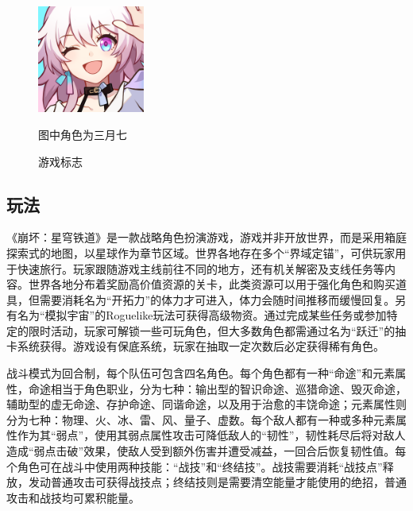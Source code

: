 \begin{figure}
    \centering
    \includegraphics[width=100pt]{docs/imgs/HSR}


    \vspace{6pt}
    \fontSimsun\sizeFivel 图中角色为三月七
    \caption{游戏标志}
    \label{fig:figure1}
\end{figure}

\subsection{玩法}

《崩坏：星穹铁道》是一款战略角色扮演游戏，游戏并非开放世界，而是采用箱庭探索式的地图，以星球作为章节区域。世界各地存在多个“界域定锚”，可供玩家用于快速旅行。玩家跟随游戏主线前往不同的地方，还有机关解密及支线任务等内容。世界各地分布着奖励高价值资源的关卡，此类资源可以用于强化角色和购买道具，但需要消耗名为“开拓力”的体力才可进入，体力会随时间推移而缓慢回复。另有名为“模拟宇宙”的Roguelike玩法可获得高级物资。通过完成某些任务或参加特定的限时活动，玩家可解锁一些可玩角色，但大多数角色都需通过名为“跃迁”的抽卡系统获得。游戏设有保底系统，玩家在抽取一定次数后必定获得稀有角色。

战斗模式为回合制，每个队伍可包含四名角色。每个角色都有一种“命途”和元素属性，命途相当于角色职业，分为七种：输出型的智识命途、巡猎命途、毁灭命途，辅助型的虚无命途、存护命途、同谐命途，以及用于治愈的丰饶命途；元素属性则分为七种：物理、火、冰、雷、风、量子、虚数。每个敌人都有一种或多种元素属性作为其“弱点”，使用其弱点属性攻击可降低敌人的“韧性”，韧性耗尽后将对敌人造成“弱点击破”效果，使敌人受到额外伤害并遭受减益，一回合后恢复韧性值。每个角色可在战斗中使用两种技能：“战技”和“终结技”。战技需要消耗“战技点”释放，发动普通攻击可获得战技点；终结技则是需要清空能量才能使用的绝招，普通攻击和战技均可累积能量。